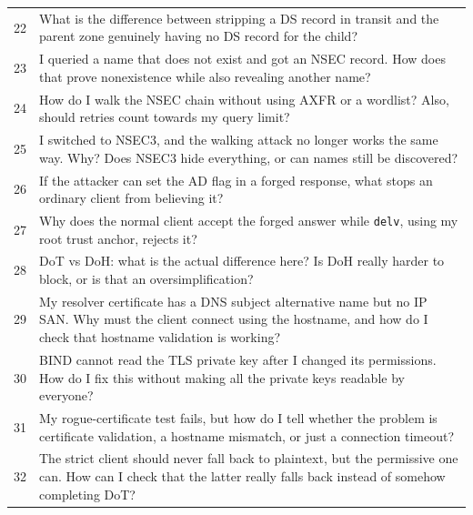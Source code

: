 \documentclass[11pt]{article}
\begin{document}
\begin{longtable}{p{0.8cm}p{12.0cm}}
    22 &
    What is the difference between stripping a DS record in transit and
    the parent zone genuinely having no DS record for the child?\\

    23 &
    I queried a name that does not exist and got an NSEC record. How
    does that prove nonexistence while also revealing another name?\\

    24 &
    How do I walk the NSEC chain without using AXFR or a wordlist?
    Also, should retries count towards my query limit?\\

    25 &
    I switched to NSEC3, and the walking attack no longer works the
    same way. Why? Does NSEC3 hide everything, or can names still be
    discovered?\\

    26 &
    If the attacker can set the AD flag in a forged response, what
    stops an ordinary client from believing it?\\

    27 &
    Why does the normal client accept the forged answer while
    \texttt{delv}, using my root trust anchor, rejects it?\\

    28 &
    DoT vs DoH: what is the actual difference here? Is DoH really
    harder to block, or is that an oversimplification?\\

    29 &
    My resolver certificate has a DNS subject alternative name but
    no IP SAN. Why must the client connect using the hostname, and
    how do I check that hostname validation is working?\\

    30 &
    BIND cannot read the TLS private key after I changed its
    permissions. How do I fix this without making all the private
    keys readable by everyone?\\

    31 &
    My rogue-certificate test fails, but how do I tell whether the
    problem is certificate validation, a hostname mismatch, or just
    a connection timeout?\\

    32 &
    The strict client should never fall back to plaintext, but the
    permissive one can. How can I check that the latter really falls
    back instead of somehow completing DoT?\\


\end{longtable}
\end{document}
